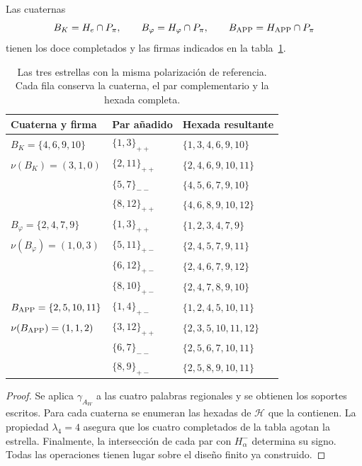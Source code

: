 \begin{proposition}
\label{star27:tres}
Las cuaternas
\[
B_K=H_e\cap P_\pi,\qquad
B_\varphi=H_\varphi\cap P_\pi,\qquad
B_{\rm APP}=H_{\rm APP}\cap P_\pi
\]
tienen los doce completados y las firmas indicados en la
tabla~\ref{star27:tabla-tres}.
\end{proposition}

\begin{table}[htbp]
\centering\small
\begin{tabular}{lll}
\toprule
Cuaterna y firma & Par añadido & Hexada resultante\\
\midrule
\(B_K=\{4,6,9,10\}\) & \(\{1,3\}_{++}\) & \(\{1,3,4,6,9,10\}\)\\
\(\nu(B_K)=(3,1,0)\) & \(\{2,11\}_{++}\) & \(\{2,4,6,9,10,11\}\)\\
 & \(\{5,7\}_{--}\) & \(\{4,5,6,7,9,10\}\)\\
 & \(\{8,12\}_{++}\) & \(\{4,6,8,9,10,12\}\)\\
\midrule
\(B_\varphi=\{2,4,7,9\}\) & \(\{1,3\}_{++}\) & \(\{1,2,3,4,7,9\}\)\\
\(\nu(B_\varphi)=(1,0,3)\) & \(\{5,11\}_{+-}\) & \(\{2,4,5,7,9,11\}\)\\
 & \(\{6,12\}_{+-}\) & \(\{2,4,6,7,9,12\}\)\\
 & \(\{8,10\}_{+-}\) & \(\{2,4,7,8,9,10\}\)\\
\midrule
\(B_{\rm APP}=\{2,5,10,11\}\) & \(\{1,4\}_{+-}\) & \(\{1,2,4,5,10,11\}\)\\
\(\nu(B_{\rm APP})=(1,1,2)\) & \(\{3,12\}_{++}\) & \(\{2,3,5,10,11,12\}\)\\
 & \(\{6,7\}_{--}\) & \(\{2,5,6,7,10,11\}\)\\
 & \(\{8,9\}_{+-}\) & \(\{2,5,8,9,10,11\}\)\\
\bottomrule
\end{tabular}
\caption{Las tres estrellas con la misma polarización de referencia.
Cada fila conserva la cuaterna, el par complementario y la hexada completa.}
\label{star27:tabla-tres}
\end{table}

\begin{proof}
Se aplica \(\gamma_{A_W}\) a las cuatro palabras regionales y se
obtienen los soportes escritos. Para cada cuaterna se enumeran las
hexadas de \(\mathcal H\) que la contienen. La propiedad
\(\lambda_4=4\) asegura que los cuatro completados de la tabla agotan
la estrella. Finalmente, la intersección de cada par con
\(H^-_\alpha\) determina su signo. Todas las operaciones tienen lugar
sobre el diseño finito ya construido.
\end{proof}

